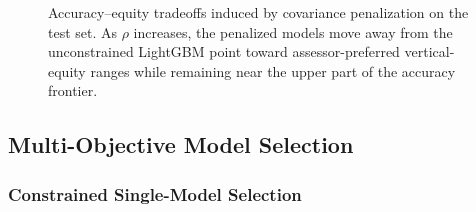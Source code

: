 \documentclass[12pt, draft]{article}
\theoremstyle{plain}
\theoremstyle{definition}
\newcommand{\1}{\mathbf{1}}
\begin{document}
{\begin{figure}[!htbp]
    \caption{Accuracy--equity tradeoffs induced by covariance penalization on the test set. As \(\rho\) increases, the penalized models move away from the unconstrained LightGBM point toward assessor-preferred vertical-equity ranges while remaining near the upper part of the accuracy frontier.}
    \label{fig:pareto_frontier}
\end{figure}



\subsection{Multi-Objective Model Selection}


\subsubsection{Constrained Single-Model Selection}

}
\end{document}
